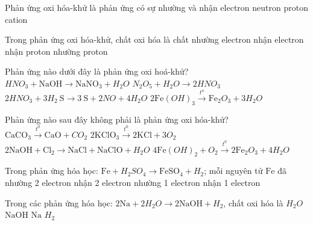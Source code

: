 \begin{ex}Phản ứng oxi hóa-khử là phản ứng có sự nhường và nhận
	\choice
	{\True electron}
	{neutron}
	{proton}
	{cation}
	\loigiai{}
\end{ex}

\begin{ex}Trong phản ứng oxi hóa-khử, chất oxi hóa là chất
	\choice
	{nhường electron}
	{\True nhận electron}
	{nhận proton}
	{nhường proton}
	\loigiai{}
\end{ex}

\begin{ex}Phản ứng nào dưới đây là phản ứng oxi hoá-khử?
	\choice
	{$HNO_3+\mathrm{NaOH} \to \mathrm{NaNO}_3+H_2O$}
	{$N_2O_5+H_2O\to 2HNO_3$}
	{\True $2HNO_3+3H_2\mathrm{~S} \to 3\mathrm{~S}+2NO+4H_2O$}
	{$2 \mathrm{Fe}(OH)_3 \xrightarrow{t^o} \mathrm{Fe}_2O_3+3 H_2 O$}
	\loigiai{}
\end{ex}

\begin{ex}[Đề THPT QG-2015]
	Phản ứng nào sau đây không phải là phản ứng oxi hóa-khử?
	\choice
	{\True $\mathrm{CaCO}_3\xrightarrow{t^0} \mathrm{CaO}+CO_2$}
	{$2\mathrm{KClO}_3\xrightarrow{t^0} 2\mathrm{KCl}+3O_2$}
	{$2\mathrm{NaOH}+\mathrm{Cl}_2\to \mathrm{NaCl}+\mathrm{NaClO}+H_2O$}
	{$4\mathrm{Fe}(OH)_2+O_2\xrightarrow{t^0} 2\mathrm{Fe}_2O_3+4H_2O$}
	\loigiai{}
\end{ex}

\begin{ex}Trong phản ứng hóa học: $\mathrm{Fe}+H_2SO_4\to \mathrm{FeSO}_4+H_2$; mỗi nguyên tử $\mathrm{Fe}$ đã
	\choice
	{\True nhường 2 electron}
	{nhận 2 electron}
	{nhường 1 electron}
	{nhận 1 electron}
	\loigiai{}
\end{ex}

\begin{ex}Trong các phản ứng hóa học: $2\mathrm{Na}+2H_2O\to 2\mathrm{NaOH}+H_2$, chất oxi hóa là
	\choice
	{\True $H_2O$}
	{$\mathrm{NaOH}$}
	{$\mathrm{Na}$}
	{$H_2$}
	\loigiai{}
\end{ex}

